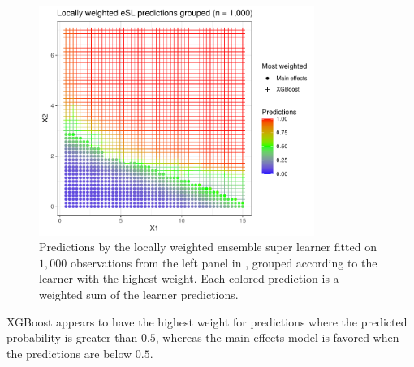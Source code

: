 \documentclass[./main.tex]{subfiles}
\begin{document}
\begin{figure}[H]
    \centering
    \includegraphics[width=0.8\textwidth]{figures/esl_preds_lw_stratified.pdf}
    \caption{Predictions by the locally weighted ensemble super learner fitted on $ 1,000 $ observations from the left panel in , grouped according to the learner with the highest weight. Each colored prediction is a weighted sum of the learner predictions.}
    \label{fig:esl_preds_lw_stratified}
\end{figure}

XGBoost appears to have the highest weight for predictions where the predicted probability is greater than $ 0.5 $, whereas the main effects model is favored when the predictions are below $ 0.5 $. 
\end{document}
